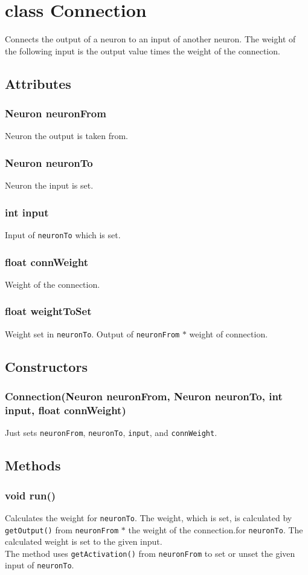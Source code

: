 \chapter{class Connection}
Connects the output of a neuron to an input of another neuron. The weight of the following input is the output value times the weight of the connection.

\section{Attributes}
\subsection{Neuron neuronFrom}
Neuron the output is taken from.

\subsection{Neuron neuronTo}
Neuron the input is set.

\subsection{int input}
Input of \texttt{neuronTo} which is set.

\subsection{float connWeight}
Weight of the connection.

\subsection{float weightToSet}
Weight set in \texttt{neuronTo}. Output of \texttt{neuronFrom} $*$ weight of connection.

\section{Constructors}
\subsection{Connection(Neuron neuronFrom, Neuron neuronTo, int input, float connWeight)}
Just sets \texttt{neuronFrom}, \texttt{neuronTo}, \texttt{input}, and \texttt{connWeight}.

\section{Methods}
\subsection{void run()}
Calculates the weight for \texttt{neuronTo}. The weight, which is set, is calculated by \texttt{getOutput()} from \texttt{neuronFrom} $*$ the weight of the connection.for \texttt{neuronTo}. The calculated weight is set to the given input.\\
The method uses \texttt{getActivation()} from \texttt{neuronFrom} to set or unset the given input of \texttt{neuronTo}.